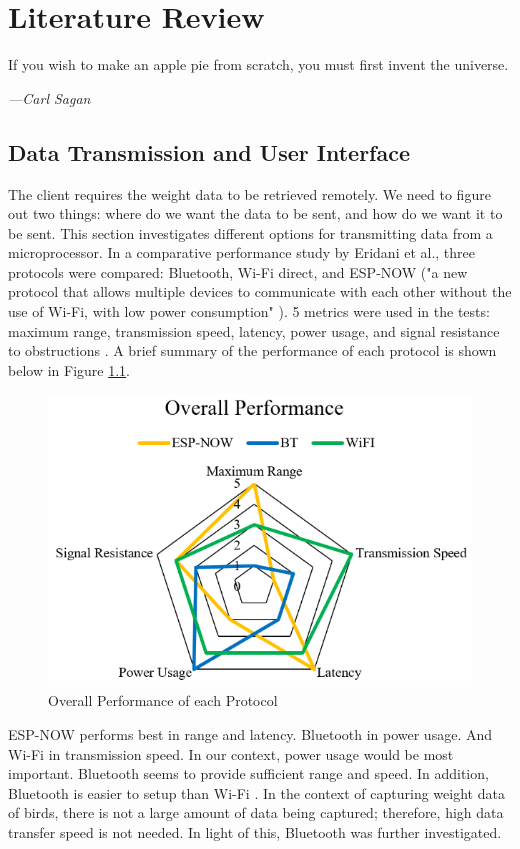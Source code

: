 \documentclass[class=report,11pt,crop=false]{standalone}
\begin{document}
\ifstandalone
\tableofcontents
\fi
\chapter{Literature Review \label{ch:literature}}
\epigraph{If you wish to make an apple pie from scratch, you must first invent the universe.}%
    {\emph{---Carl Sagan}}
\vspace{0.5cm}

\section{Data Transmission and User Interface}
The client requires the weight data to be retrieved remotely. We need to figure out two things: where do we want the data to be sent, and how do we want it to be sent.
This section investigates different options for transmitting data from a microprocessor. In a comparative performance study by Eridani et al., three protocols were compared: Bluetooth, Wi-Fi direct, and ESP-NOW ("a new protocol that allows multiple devices to communicate with each other without the use of Wi-Fi, with low power consumption" \cite{comparitiveEspnow}). 5 metrics were used in the tests: maximum range, transmission speed, latency, power usage, and signal resistance to obstructions \cite{comparitiveEspnow}. A brief summary of the performance of each protocol is shown below in Figure \ref{fig:performance}.
\begin{figure}[h]
	\centering
	\includegraphics[width=0.7\linewidth]{Figures/performance}
	\caption{Overall Performance of each Protocol}
	\label{fig:performance}
\end{figure}

ESP-NOW performs best in range and latency. Bluetooth in power usage. And Wi-Fi in transmission speed. In our context, power usage would be most important. Bluetooth seems to provide sufficient range and speed.
In addition, Bluetooth is easier to setup than Wi-Fi \cite{comparativewifi}. In the context of capturing weight data of birds, there is not a large amount of data being captured; therefore, high data transfer speed is not needed. In light of this, Bluetooth was further investigated.

\ifstandalone

\printnoidxglossary[type=\acronymtype,nonumberlist]
\fi
\end{document}
